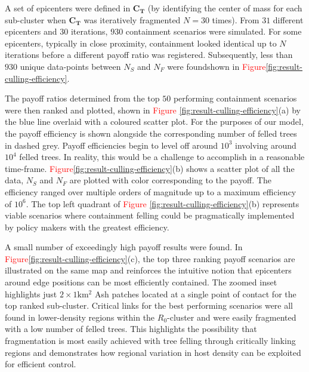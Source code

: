 A set of epicenters were defined in $\mathbf{C_T}$ (by identifying the center of mass for each sub-cluster when $\mathbf{C_T}$ was iteratively fragmented $N=30$ times). 
From $31$ different epicenters and $30$ iterations, $930$ containment scenarios were simulated. 
For some epicenters, typically in close proximity, containment looked identical up to $N$ iterations before a different payoff ratio was registered. 
Subsequently, less than $930$ unique data-points between $N_S$ and $N_F$ were found\textemdash shown in \textcolor{red}{Figure\ref{fig:result-culling-efficiency}}.

The payoff ratios determined from the top $50$ performing containment scenarios were then ranked and plotted, 
shown in \textcolor{red}{Figure} \ref{fig:result-culling-efficiency}(a) by the blue line overlaid with a coloured scatter plot. 
For the purposes of our model, the payoff efficiency is shown alongside the corresponding number of felled trees in dashed grey. 
Payoff efficiencies begin to level off around $\mathrm{10^3}$ involving around $\mathrm{10^4}$ felled trees. 
In reality, this would be a challenge to accomplish in a reasonable time-frame. 
\textcolor{red}{Figure}\ref{fig:result-culling-efficiency}(b) shows a scatter plot of all the data, $N_S$ and $N_F$ are plotted with color corresponding to the payoff. 
The efficiency ranged over multiple orders of magnitude up to a maximum efficiency of $\mathrm{10^6}$. 
The top left quadrant of \textcolor{red}{Figure} \ref{fig:result-culling-efficiency}(b) represents viable scenarios where containment felling could be pragmatically implemented by policy makers with the greatest efficiency.

A small number of exceedingly high payoff results were found. 
In \textcolor{red}{Figure}\ref{fig:result-culling-efficiency}(c), the top three ranking payoff scenarios are illustrated on the same map and reinforces the intuitive notion that epicenters around edge positions can be most efficiently contained. 
The zoomed inset highlights just $\mathrm{2\times 1km^2}$ Ash patches located at a single point of contact for the top ranked sub-cluster. 
Critical links for the best performing scenarios were all found in lower-density regions within the $R_0$-cluster and were easily fragmented with a low number of felled trees. 
This highlights the possibility that fragmentation is most easily achieved with tree felling through critically linking regions and
demonstrates how regional variation in host density can be exploited for efficient control. 

